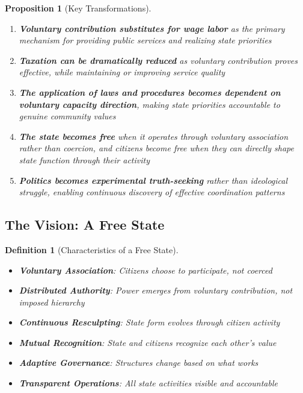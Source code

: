 \documentclass[11pt]{article}
\newtheorem{definition}{Definition}
\newtheorem{proposition}{Proposition}
\begin{document}
\begin{proposition}[Key Transformations]
\begin{enumerate}
\item \textbf{Voluntary contribution substitutes for wage labor} as the primary mechanism for providing public services and realizing state priorities

\item \textbf{Taxation can be dramatically reduced} as voluntary contribution proves effective, while maintaining or improving service quality

\item \textbf{The application of laws and procedures becomes dependent on voluntary capacity direction}, making state priorities accountable to genuine community values

\item \textbf{The state becomes free} when it operates through voluntary association rather than coercion, and citizens become free when they can directly shape state function through their activity

\item \textbf{Politics becomes experimental truth-seeking} rather than ideological struggle, enabling continuous discovery of effective coordination patterns
\end{enumerate}
\end{proposition}

\subsection{The Vision: A Free State}

\begin{definition}[Characteristics of a Free State]
\begin{itemize}
\item \textbf{Voluntary Association}: Citizens choose to participate, not coerced
\item \textbf{Distributed Authority}: Power emerges from voluntary contribution, not imposed hierarchy
\item \textbf{Continuous Resculpting}: State form evolves through citizen activity
\item \textbf{Mutual Recognition}: State and citizens recognize each other's value
\item \textbf{Adaptive Governance}: Structures change based on what works
\item \textbf{Transparent Operations}: All state activities visible and accountable
\end{itemize}
\end{definition}
\end{document}
